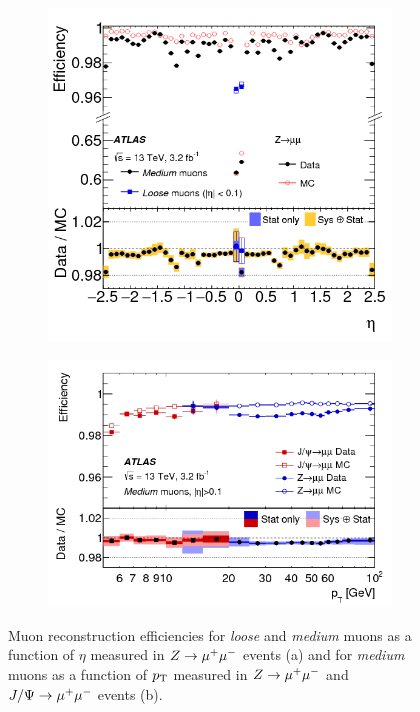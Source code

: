 \begin{figure}[htb] %
    \begin{center}
        \begin{subfigure}[c]{0.45\textwidth}
            \includegraphics[width=\textwidth]{./figures/object_selection/mu_id_eff_a.png}
            \caption{}
        \end{subfigure}
        \hfill
        \begin{subfigure}[c]{0.45\textwidth}
            \includegraphics[width=\textwidth]{./figures/object_selection/mu_id_eff_b.png}
            \caption{}
        \end{subfigure}
        \caption{Muon reconstruction efficiencies for \emph{loose} and \emph{medium} muons as a function of $\eta$
                measured in $Z \to \mu^+\mu^-$ events (a) and for \emph{medium} muons as a function of $p_\text{T}$ measured in
                $Z \to \mu^+\mu^-$ and $J/\Psi \to \mu^+\mu^-$ events (b).~\cite{PERF-2015-10}}\label{fig:object_selection:mu_id_eff}
    \end{center}
\end{figure}


